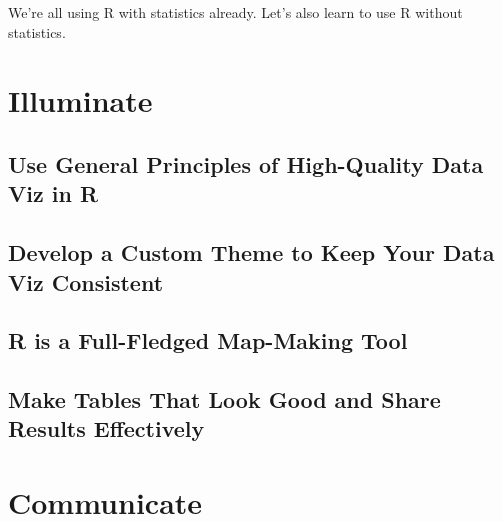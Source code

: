 \documentclass[
]{book}
\begin{document}
We're all using R with statistics already. Let's also learn to use R without statistics.

\hypertarget{part-illuminate}{%
\part*{Illuminate}\label{part-illuminate}}

\hypertarget{use-general-principles-of-high-quality-data-viz-in-r}{%
\chapter*{Use General Principles of High-Quality Data Viz in R}\label{use-general-principles-of-high-quality-data-viz-in-r}}

\hypertarget{develop-a-custom-theme-to-keep-your-data-viz-consistent}{%
\chapter*{Develop a Custom Theme to Keep Your Data Viz Consistent}\label{develop-a-custom-theme-to-keep-your-data-viz-consistent}}

\hypertarget{r-is-a-full-fledged-map-making-tool}{%
\chapter*{R is a Full-Fledged Map-Making Tool}\label{r-is-a-full-fledged-map-making-tool}}

\hypertarget{make-tables-that-look-good-and-share-results-effectively}{%
\chapter*{Make Tables That Look Good and Share Results Effectively}\label{make-tables-that-look-good-and-share-results-effectively}}

\hypertarget{part-communicate}{%
\part*{Communicate}\label{part-communicate}}
\end{document}
